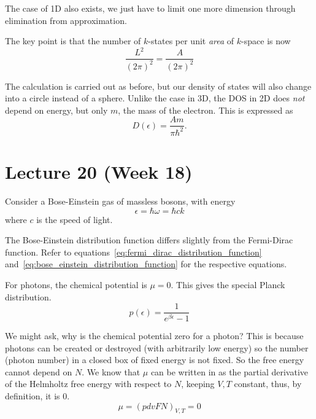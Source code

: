 \documentclass[12pt,chapterprefix=false,dvipsnames]{scrbook}
\theoremstyle{dotless}
\theoremstyle{definition}
\begin{document}
The case of 1D also exists, we just have to limit one more
dimension through elimination from approximation.

The key point is that the number of
$k$-states per unit \textit{area}
of $k$-space is now
\begin{equation}
	\frac{L^2}{{\left(2\pi\right)}^2}
	=
	\frac{A}{{\left(2\pi\right)}^2}
\end{equation}

The calculation is carried out as before, but our density of
states will also change into a circle instead of a sphere.
Unlike the case in 3D, the DOS in 2D does
\textit{not} depend on energy, but only
$m$, the mass of the electron. This is
expressed as
\begin{equation}
	D\left(\epsilon\right) = \frac{Am}{\pi\hbar^2}.
\end{equation}

\chapter{Lecture 20 (Week 18)}%
\label{cha:lecture_20}%

Consider a Bose-Einstein gas of massless bosons, with energy
\begin{equation}
	\epsilon
	=
	\hbar\omega
	=
	\hbar ck
\end{equation}
where $c$ is the speed of light.

The Bose-Einstein distribution function differs slightly from
the Fermi-Dirac function. Refer to
equations~\ref{eq:fermi_dirac_distribution_function} and~\ref{eq:bose_einstein_distribution_function}
for the respective equations.

For photons, the chemical potential is $\mu = 0$.
This gives the special Planck distribution.
\begin{equation}
	\label{eq:plancks_distribution_function}%
	p\left(\epsilon\right) = \frac{1}{e^{\beta\epsilon} - 1}
\end{equation}

We might ask, why is the chemical potential zero for a photon?
This is because photons can be created or destroyed (with
arbitrarily low energy) so the number (photon number) in a
closed box of fixed energy is not fixed. So the free energy
cannot depend on $N$. We know that
$\mu$ can be written in as the partial
derivative of the Helmholtz free energy with respect to
$N$, keeping $V,T$
constant, thus, by definition, it is 0.
\begin{equation}
	\mu = {\left(pdv{F}{N}\right)}_{V,T} = 0
\end{equation}
\end{document}
